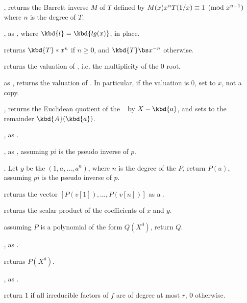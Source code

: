 , returns the Barrett inverse
$M$ of $T$ defined by $M(x)\*x^n\*T(1/x)\equiv 1\pmod{x^{n-1}}$ where $n$ is
the degree of $T$.

, as , where
$\kbd{l} = \kbd{lg(x)}$, in place.

 returns $\kbd{T} * x^n$ if $n\geq 0$,
and $\kbd{T} \bs x^{-n}$ otherwise.

 returns the valuation of , i.e. the
multiplicity of the $0$ root.

 as , returns the
valuation of . In particular, if the valuation is $0$, set 
to $x$, not a copy.

, returns the
Euclidean quotient of the ~ by $X - \kbd{a}$, and sets
 to the remainder $ \kbd{A}(\kbd{a})$.

, as .

, as ,
assuming $pi$ is the pseudo inverse of $p$.

. Let $y$ be
the  $(1,a,\dots,a^n)$, where $n$ is the degree of the
 $P$, return $P(a)$, assuming $pi$ is the pseudo inverse of $p$.

 returns the vector
$[P(v[1]),\ldots,P(v[n])]$ as a .

 returns the scalar product
of the coefficients of $x$ and $y$.

 assuming $P$ is a polynomial of the
form $Q(X^d)$, return $Q$.

, as .

 returns $P(X^d)$.


, as .

 return $1$ if all
irreducible factors of $f$ are of degree at most $r$, $0$ otherwise.

